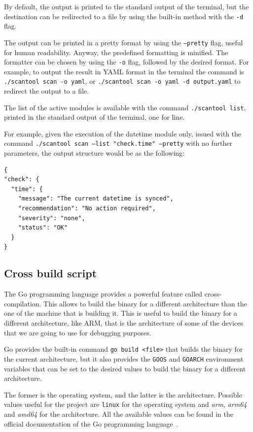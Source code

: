 By default, the output is printed to the standard output of the terminal, but the destination can be redirected to a file by using the built-in method with the \texttt{-d} flag.

The output can be printed in a pretty format by using the \texttt{--pretty} flag, useful for human readability. Anyway, the predefined formatting is minified. The formatter can be chosen by using the \texttt{-o} flag, followed by the desired format. For example, to output the result in YAML format in the terminal the command is \texttt{./scantool scan -o yaml}, or \texttt{./scantool scan -o yaml -d output.yaml} to redirect the output to a file.

The list of the active modules is available with the command \texttt{./scantool list}, printed in the standard output of the terminal, one for line.

For example, given the execution of the datetime module only, issued with the command \texttt{./scantool scan --list "check.time" --pretty} with no further parameters, the output structure would be as the following:

\begin{lstlisting}[style=json, caption={Output of the datetime module}]
{
"check": {
  "time": {
    "message": "The current datetime is synced",
    "recommendation": "No action required",
    "severity": "none",
    "status": "OK"
  }
}
\end{lstlisting}

\subsection{Cross build script}

The Go programming language provides a powerful feature called cross-compilation. This allows to build the binary for a different architecture than the one of the machine that is building it. This is useful to build the binary for a different architecture, like ARM, that is the architecture of some of the devices that we are going to use for debugging purposes.

Go provides the built-in command \texttt{go build <file>} that builds the binary for the current architecture, but it also provides the \texttt{GOOS} and \texttt{GOARCH} environment variables that can be set to the desired values to build the binary for a different architecture.

The former is the operating system, and the latter is the architecture. Possible values useful for the project are \texttt{linux} for the operating system and \textit{arm}, \textit{arm64} and \textit{amd64} for the architecture. All the available values can be found in the official documentation of the Go programming language~\cite{go-valid-goos-goarch-combinations}.

